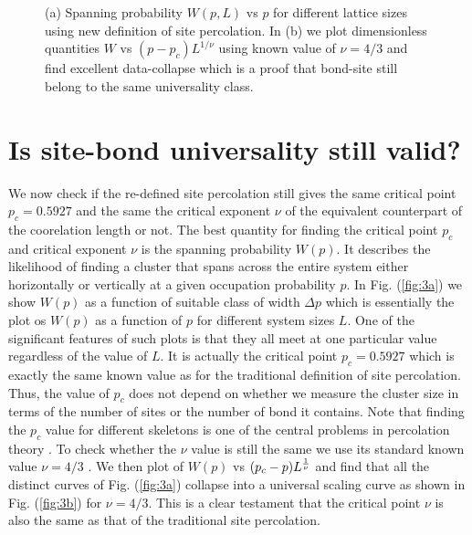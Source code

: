 \documentclass[twocolumn,showpacs,preprintnumbers,amsmath,amssymb]{article}
\begin{document}
\begin{figure}

\centering



\subfloat[]
{
\label{fig:3a}
}

\subfloat[]
{
\label{fig:3b}
}
\caption{(a) Spanning probability $W(p,L)$ vs $p$ for different lattice sizes using new definition
of site percolation. 
In (b) we plot dimensionless quantities $W$ vs $(p-p_c)L^{1/\nu}$ using known value of $\nu=4/3$
and find excellent data-collapse which is a proof that bond-site still belong to the same universality class.
} 

\label{fig:3ab}
\end{figure}



\section{Is site-bond universality still valid?}


We now check if the re-defined site percolation still gives the
same critical point $p_c=0.5927$ and the same the critical exponent $\nu$ of the equivalent
counterpart of the coorelation length or not.
The best quantity for finding the critical point $p_c$ and critical exponent $\nu$ is the
spanning probability $W(p)$. It describes the likelihood of finding a 
cluster that spans across the entire system
either horizontally or vertically at a given occupation probability $p$.
In Fig. (\ref{fig:3a}) we show $W(p)$ as a function of suitable class of width $\Delta p$
which is essentially the plot os $W(p)$ as a function of
$p$ for different system sizes $L$. One of the significant features of such plots is that they all 
meet at one particular value regardless of the value of $L$. It 
is actually the critical point $p_c=0.5927$
which is exactly the same known value as for the traditional definition of site percolation. 
Thus, the value of $p_c$ does not depend on whether we measure the cluster size
in terms of the number of sites or the number of bond it contains.
Note that finding the $p_c$ value for different skeletons
is one of the central problems in percolation theory \cite{ref.ziff_pc_1, ref.ziff_pc_2}. 
To check whether the $\nu$ value is still the same we use its standard known value
$\nu=4/3$ \cite{ref.ziff_nu}. We then plot of $W(p)$ vs $(p_c- p)L^{{{1}\over{\nu}}}$ and
find that all the distinct curves of Fig. (\ref{fig:3a}) collapse into a universal 
scaling curve as shown in Fig. (\ref{fig:3b}) for $\nu=4/3$. This is a clear testament
that the critical point $\nu$ is also the same as that of the traditional site percolation.  
\end{document}
